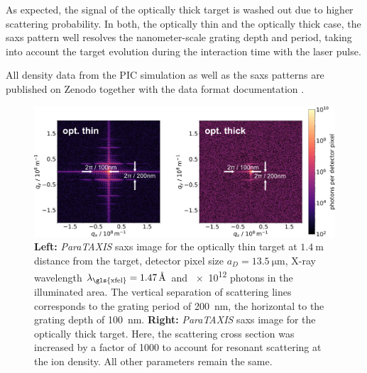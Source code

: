 As expected, the signal of the optically thick target is washed out due to
higher scattering probability. In both, the optically thin and the optically
thick case, the
\gls{saxs} pattern well resolves the nanometer-scale grating depth and period, taking
into account the target evolution during the interaction time with the laser
pulse.

All density data from the PIC simulation as well as the \gls{saxs} patterns are
published on Zenodo together with the data format documentation
\cite{Garten2017.zenodo.885033}.

\begin{figure}
\centering
  \includegraphics[width=.99\linewidth]{figures/scattering_images_v2.png}
\caption{
\textbf{Left:} \textit{ParaTAXIS} \gls{saxs} image for the optically thin target at
$\SI{1.4}{\metre}$ distance from the target, detector pixel size $a_D =
\SI{13.5}{\micro\metre}$, X-ray wavelength $\lambda_\mathrm{\gls{xfel}} =
\SI{1.47}{\angstrom}$ and
\num{e12} photons in the illuminated area. The vertical separation of scattering
lines corresponds to the grating period of \SI{200}{\nano\metre}, the horizontal to
the grating depth of \SI{100}{\nano\metre}.
\textbf{Right:} \textit{ParaTAXIS} \gls{saxs} image for the optically thick target. Here, the
scattering cross section was increased by a factor of \num{1000} to account for
resonant scattering at the ion density. All other parameters remain the same.  }
  \label{fig:scattering}
\end{figure}



